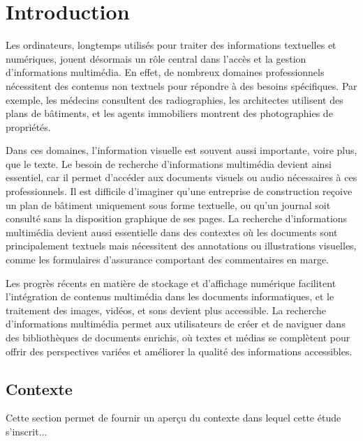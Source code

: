 

\tableofcontents
\newpage

\chapter*{Introduction}

\par 
Les ordinateurs, longtemps utilisés pour traiter des informations textuelles et numériques, jouent désormais un 
rôle central dans l'accès et la gestion d’informations multimédia. En effet, de nombreux domaines professionnels 
nécessitent des contenus non textuels pour répondre à des besoins spécifiques. Par exemple, les médecins consultent
 des radiographies, les architectes utilisent des plans de bâtiments, et les agents immobiliers montrent des 
 photographies de propriétés.
 \par Dans ces domaines, l’information visuelle est souvent aussi importante, voire plus, que le texte.
  Le besoin de recherche d’informations multimédia devient ainsi essentiel, car il permet d’accéder aux documents
   visuels ou audio nécessaires à ces professionnels. Il est difficile d’imaginer qu'une entreprise de construction 
   reçoive un plan de bâtiment uniquement sous forme textuelle, ou qu’un journal soit consulté sans la disposition 
   graphique de ses pages. La recherche d’informations multimédia devient aussi essentielle dans des contextes où 
   les documents sont principalement textuels mais nécessitent des annotations ou illustrations visuelles, comme 
   les formulaires d’assurance comportant des commentaires en marge.
   \par 
   Les progrès récents en matière de stockage et d’affichage numérique facilitent l’intégration de contenus multimédia
    dans les documents informatiques, et le traitement des images, vidéos, et sons devient plus accessible.
     La recherche d’informations multimédia permet aux utilisateurs de créer et de naviguer dans des bibliothèques
      de documents enrichis, où textes et médias se complètent pour offrir des perspectives variées et améliorer
       la qualité des informations accessibles.


\section*{Contexte}
Cette section permet de fournir un aperçu du contexte dans lequel cette étude s’inscrit...

